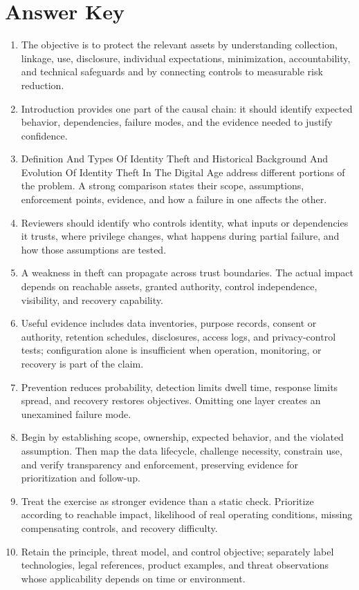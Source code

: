 \documentclass[11pt]{article}
\begin{document}
\section*{Answer Key}
\begin{enumerate}
\item The objective is to protect the relevant assets by understanding collection, linkage, use, disclosure, individual expectations, minimization, accountability, and technical safeguards and by connecting controls to measurable risk reduction.
\item Introduction provides one part of the causal chain: it should identify expected behavior, dependencies, failure modes, and the evidence needed to justify confidence.
\item Definition And Types Of Identity Theft and Historical Background And Evolution Of Identity Theft In The Digital Age address different portions of the problem. A strong comparison states their scope, assumptions, enforcement points, evidence, and how a failure in one affects the other.
\item Reviewers should identify who controls identity, what inputs or dependencies it trusts, where privilege changes, what happens during partial failure, and how those assumptions are tested.
\item A weakness in theft can propagate across trust boundaries. The actual impact depends on reachable assets, granted authority, control independence, visibility, and recovery capability.
\item Useful evidence includes data inventories, purpose records, consent or authority, retention schedules, disclosures, access logs, and privacy-control tests; configuration alone is insufficient when operation, monitoring, or recovery is part of the claim.
\item Prevention reduces probability, detection limits dwell time, response limits spread, and recovery restores objectives. Omitting one layer creates an unexamined failure mode.
\item Begin by establishing scope, ownership, expected behavior, and the violated assumption. Then map the data lifecycle, challenge necessity, constrain use, and verify transparency and enforcement, preserving evidence for prioritization and follow-up.
\item Treat the exercise as stronger evidence than a static check. Prioritize according to reachable impact, likelihood of real operating conditions, missing compensating controls, and recovery difficulty.
\item Retain the principle, threat model, and control objective; separately label technologies, legal references, product examples, and threat observations whose applicability depends on time or environment.
\end{enumerate}
\end{document}
